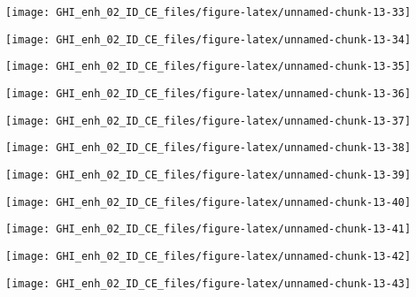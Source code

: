 \documentclass[
  10pt,
  a4paper,oneside]{article}
\begin{document}
\begin{center}\texttt{[image: GHI\_enh\_02\_ID\_CE\_files/figure-latex/unnamed-chunk-13-33]} \end{center}

\begin{center}\texttt{[image: GHI\_enh\_02\_ID\_CE\_files/figure-latex/unnamed-chunk-13-34]} \end{center}

\begin{center}\texttt{[image: GHI\_enh\_02\_ID\_CE\_files/figure-latex/unnamed-chunk-13-35]} \end{center}

\begin{center}\texttt{[image: GHI\_enh\_02\_ID\_CE\_files/figure-latex/unnamed-chunk-13-36]} \end{center}

\begin{center}\texttt{[image: GHI\_enh\_02\_ID\_CE\_files/figure-latex/unnamed-chunk-13-37]} \end{center}

\begin{center}\texttt{[image: GHI\_enh\_02\_ID\_CE\_files/figure-latex/unnamed-chunk-13-38]} \end{center}

\begin{center}\texttt{[image: GHI\_enh\_02\_ID\_CE\_files/figure-latex/unnamed-chunk-13-39]} \end{center}

\begin{center}\texttt{[image: GHI\_enh\_02\_ID\_CE\_files/figure-latex/unnamed-chunk-13-40]} \end{center}

\begin{center}\texttt{[image: GHI\_enh\_02\_ID\_CE\_files/figure-latex/unnamed-chunk-13-41]} \end{center}

\begin{center}\texttt{[image: GHI\_enh\_02\_ID\_CE\_files/figure-latex/unnamed-chunk-13-42]} \end{center}

\begin{center}\texttt{[image: GHI\_enh\_02\_ID\_CE\_files/figure-latex/unnamed-chunk-13-43]} \end{center}
\end{document}
